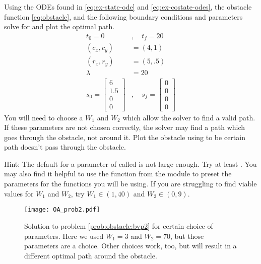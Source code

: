 \begin{problem}
\label{prob:obstacle:bvp2}
Using the ODEs found in \ref{eq:ex-state-ode} and \ref{eq:ex-costate-odes}, the obstacle function \ref{eq:obstacle}, and the following boundary conditions and parameters solve for and plot the optimal path.
\begin{align*}
    t_0 = 0 &, \quad t_f = 20\\
    (c_x,c_y) &= (4,1)\\
    (r_x,r_y) &= (5,.5)\\
    \lambda &= 20\\
    s_0 = \begin{bmatrix}6\\1.5\\0\\0 \end{bmatrix}&, \quad s_f = \begin{bmatrix}0\\0\\0\\0 \end{bmatrix}
\end{align*}
You will need to choose a $W_1$ and $W_2$ which allow the solver to find a valid path.
If these parameters are not chosen correctly, the solver may find a path which goes through the obstacle, not around it.
Plot the obstacle using  to be certain path doesn't pass through the obstacle.

Hint: The default for a parameter of  called  is not large enough.
Try at least .
You may also find it helpful to use the function  from the module  to preset the parameters for the functions you will be using.
If you are struggling to find viable values for $W_1$ and $W_2$, try $W_1\in (1,40)$ and $W_2\in (0,9)$. 
\end{problem}

\begin{figure}[H]
    \centering
    \texttt{[image: OA\_prob2.pdf]}
    \caption{Solution to problem \ref{prob:obstacle:bvp2} for certain choice of parameters.  Here we used $W_1=3$ and $W_2=70$, but those parameters are a choice.  Other choices work, too, but will result in a different optimal path around the obstacle.}
    \label{fig:OA_prob2}
\end{figure}

